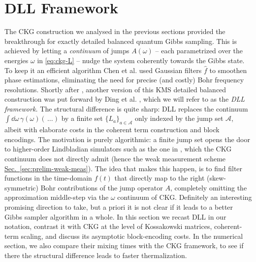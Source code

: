 \chapter{DLL Framework}
\label{sec:dll}
The CKG construction we analysed in the previous sections provided the breakthrough for exactly detailed balanced quantum Gibbs sampling. This is achieved by letting a \emph{continuum} of jumps $A(\omega)$ -- each parametrized over the energies $\omega$ in \eqref{eq:ckg-L} -- nudge the system coherently towards the Gibbs state. To keep it an efficient algorithm Chen et al. used Gaussian filters $\hat{f}$ to smoothen phase estimations, eliminating the need for precise (and costly) Bohr frequency resolutions. Shortly after \cite{chen2023efficient}, another version of this KMS detailed balanced construction was put forward by Ding et al. \cite{ding2025efficient}, which we will refer to as the \emph{DLL framework.} The structural difference is quite sharp: DLL replaces the continuum $\int \dd\omega\, \gamma(\omega) (\,\dots)$ by a finite set $\{L_a\}_{a\in\mathcal{A}}$ only indexed by the jump set $\mathcal{A}$, albeit with elaborate costs in the coherent term construction and block encodings. The motivation is purely algorithmic: a finite jump set opens the door to higher-order Lindbladian simulators such as the one in \cite{li2022simulating}, which the CKG continuum does not directly admit (hence the weak measurement scheme \hyperref[sec:prelim-weak-meas]{Sec.~\ref*{sec:prelim-weak-meas}}). The idea that makes this happen, is to find filter functions in the time-domain $f(t)$ that directly map to the right (skew-symmetric) Bohr contributions of the jump operator $A$, completely omitting the approximation middle-step via the $\omega$ continuum of CKG. Definitely an interesting promising direction to take, but a priori it is not clear if it leads to a better Gibbs sampler algorithm in a whole. In this section we recast DLL in our notation, contrast it with CKG at the level of Kossakowski matrices, coherent-term scaling, and discuss its asymptotic block-encoding costs. In the numerical section, we also compare their mixing times with the CKG framework, to see if there the structural difference leads to faster thermalization. 

\smallskip
\label{sec:dll-discrete-jumps}
